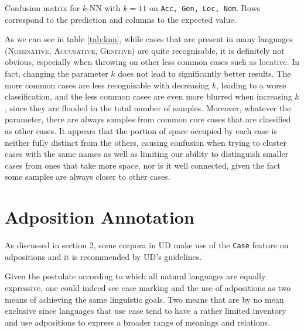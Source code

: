 \documentclass[11pt]{article}
\newcommand{\scsf}[1]{\textsc{\textsf{#1}}} %
\begin{document}
\begin{table}[h]
\medskip 

\pgfplotscolorbardrawstandalone[%
  colorbar style={
    ticklabel style={
      font=\tiny, 
      /pgf/number format/precision=3, 
      /pgf/number format/relative*=4, 
    }, 
  }, 
  colorbar horizontal, 
  colormap access=const, 
   point meta min=0, point meta max=250]
	\caption{Confusion matrix for $k$-NN with $k = 11$ on \texttt{Acc, Gen, Loc, Nom}. 
 Rows correspond to the prediction and columns to the expected value.}
	\label{tab:knn}
\end{table}

As we can see in table \ref{tab:knn}, while cases that are present in many languages (\scsf{Nominative, Accusative, Genitive}) are quite recognisable, it is definitely not obvious, especially when throwing on other less common cases such as locative. 
In fact, changing the parameter $k$ does not lead to significantly better results. 
The more common cases are less recognisable with decreasing $k$, leading to a worse classification, and the less common cases are even more blurred when increasing $k$, since they are flooded in the total number of samples. 
Moreover, whatever the parameter, there are always samples from common core cases that are classified as other cases. 
It appears that the portion of space occupied by each case is neither fully distinct from the others, causing confusion when trying to cluster cases with the same names as well as limiting our ability to distinguish smaller cases from ones that take more space, nor is it well connected, given the fact some samples are always closer to other cases.%

%

\section{Adposition Annotation}

As discussed in section 2, some corpora in UD make use of the \texttt{Case} feature on adpositions and it is recommended by UD's guidelines.

Given the postulate according to which all natural languages are equally expressive, one could indeed see case marking and the use of adpositions as two means of achieving the same linguistic goals.
Two means that are by no mean exclusive since languages that use case tend to have a rather limited inventory and use adpositions to express a broader range of meanings and relations.
\end{document}
